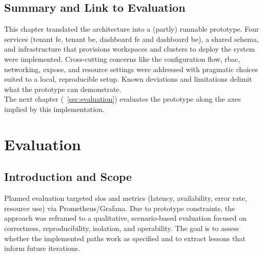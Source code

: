 \documentclass[11pt, a4paper, oneside, listof=totoc]{scrartcl}
\begin{document}
        \subsection{Summary and Link to Evaluation}\label{subsec:summaryAndLinkToEvaluation}
            This chapter translated the architecture into a (partly) runnable prototype.
            Four services (tenant \gls{fe}, tenant \gls{be}, dashboard \gls{fe} and dashboard
            \gls{be}), a shared schema, and infrastructure that provisions workspaces and clusters
            to deploy the system were implemented.
            Cross-cutting concerns like the configuration flow, \gls{rbac}, networking, expose, and
            resource settings were addressed with pragmatic choices suited to a local, reproducible
            setup.
            Known deviations and limitations delimit what the prototype can demonstrate.\\
            The next chapter (~\autoref{sec:evaluation}) evaluates the prototype along the axes
            implied by this implementation.

    \clearpage

    \section{Evaluation}\label{sec:evaluation}

        \subsection{Introduction and Scope}\label{subsec:introductionAndScope}
            Planned evaluation targeted \glspl{slo} and metrics (latency, availability, error rate,
            resource use) via Prometheus/Grafana.
            Due to prototype constraints, the approach was reframed to a qualitative, scenario-based
            evaluation focused on correctness, reproducibility, isolation, and operability.
            The goal is to assess whether the implemented paths work as specified and to extract
            lessons that inform future iterations.
\end{document}
